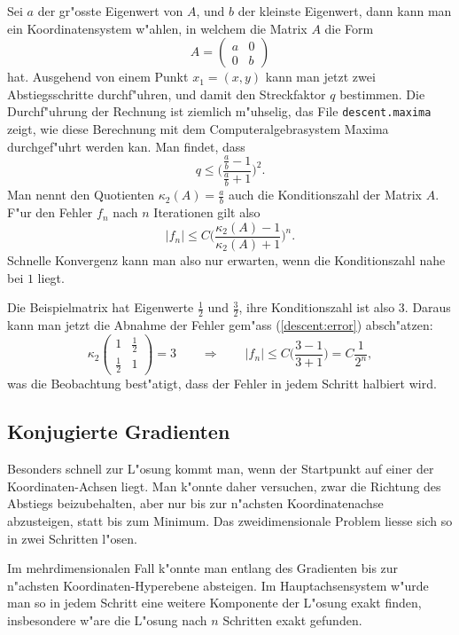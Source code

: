 Sei $a$ der gr"osste Eigenwert von $A$, und $b$ der kleinste Eigenwert,
dann kann man ein Koordinatensystem w"ahlen, in welchem die Matrix $A$
die Form
\[
A=\begin{pmatrix}a&0\\0&b\end{pmatrix}
\]
hat.
Ausgehend von einem Punkt $x_1=(x,y)$ kann man jetzt zwei Abstiegsschritte
durchf"uhren, und damit den Streckfaktor $q$ bestimmen.
Die Durchf"uhrung der Rechnung ist ziemlich m"uhselig, das
File \verb+descent.maxima+ zeigt, wie diese Berechnung mit dem
Computeralgebrasystem Maxima durchgef"uhrt werden kan. Man findet,
dass 
\[
q\le \biggl(\frac{\frac{a}{b}-1}{\frac{a}{b}+1}\biggr)^2.
\]
Man nennt den Quotienten $\kappa_2(A)=\frac{a}{b}$ auch die
Konditionszahl der Matrix $A$.
F"ur den Fehler $f_n$ nach $n$ Iterationen gilt also
\begin{equation}
|f_n| \le C\biggl(\frac{\kappa_2(A)-1}{\kappa_2(A)+1}\biggr)^n.
\label{descent:error}
\end{equation}
Schnelle Konvergenz kann man also nur erwarten, wenn die Konditionszahl
nahe bei $1$ liegt.

\begin{beispiel}
Die Beispielmatrix hat Eigenwerte $\frac12$ und $\frac32$, ihre
Konditionszahl ist also 3.
Daraus kann man jetzt die Abnahme der Fehler gem"ass (\ref{descent:error})
absch"atzen:
\[
\kappa_2
\begin{pmatrix}1&\frac12\\\frac12&1\end{pmatrix}
=
3\qquad\Rightarrow\qquad
|f_n|\le C\biggl(\frac{3-1}{3+1}\biggr)=C\frac1{2^n},
\]
was die Beobachtung best"atigt, dass der Fehler in jedem Schritt halbiert
wird.
\end{beispiel}

\subsection{Konjugierte Gradienten}
Besonders schnell zur L"osung kommt man, wenn der Startpunkt auf einer
der Koordinaten-Achsen liegt.
Man k"onnte daher versuchen, zwar die Richtung des Abstiegs beizubehalten,
aber nur bis zur n"achsten Koordinatenachse abzusteigen, statt bis zum
Minimum.
Das zweidimensionale Problem liesse sich so in zwei Schritten l"osen.

Im mehrdimensionalen Fall k"onnte man entlang des Gradienten bis zur
n"achsten Koordinaten-Hyperebene absteigen.
Im Hauptachsensystem w"urde man so in jedem Schritt eine weitere Komponente
der L"osung exakt finden, insbesondere w"are die L"osung nach $n$
Schritten exakt gefunden.

